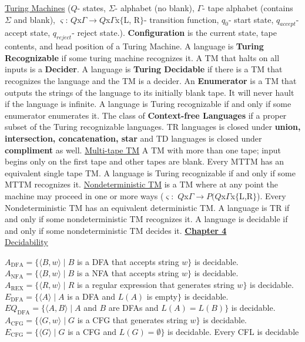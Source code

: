 \documentclass[9pt]{article}
\begin{document}
\uline{Turing Machines} ($Q$- states, $\Sigma$- alphabet (no blank), $\Gamma$- tape alphabet (contains $\Sigma$ and blank), $\varsigma$: $Q$x$\Gamma \rightarrow Q$x$\Gamma$x$\{$L, R$\}$- transition function, $q_0$- start state, $q_{accept}$- accept state, $q_{reject}$- reject state.). \textbf{Configuration} is the current state, tape contents, and head position of a Turing Machine. A language is \textbf{Turing Recognizable} if some turing machine recognizes it. A TM that halts on all inputs is a \textbf{Decider}. A language is \textbf{Turing Decidable} if there is a TM that recognizes the language and the TM is a decider. An \textbf{Enumerator} is a TM that outputs the strings of the language to its initially blank tape. It will never hault if the language is infinite. A language is Turing recognizable if and only if some enumerator enumerates it. The class of \textbf{Context-free Languages} if a proper subset of the Turing recognizable languages. TR languages is closed under \textbf{union, intersection, concatenation, star} and TD languages is closed under \textbf{compliment} as well.\newline
\uline{Multi-tape TM} A TM with more than one tape; input begins only on the first tape and other tapes are blank. Every MTTM has an equivalent single tape TM. A language is Turing recognizable if and only if some MTTM recognizes it.\newline
\uline{Nondeterministic TM} is a TM where at any point the machine may proceed in one or more ways ($\varsigma:$ $Q$x$\Gamma\rightarrow P(Q$x$\Gamma$x$\{$L,R$\}$). Every Nondeterministic TM has an equivalent deterministic TM. A language is TR if and only if some nondeterministic TM recognizes it. A language is decidable if and only if some nondeterministic TM decides it.\newline
\uline{\textbf{Chapter 4}}\\
\uline{Decidability}\newline
\begin{minipage}[t]{.48\textwidth}
    \noindent$A_{\text{DFA}}=\{\langle B,w\rangle \mid B$ is a DFA that accepts string $w\}$ is decidable.\newline
    $A_{\text{NFA}}=\{\langle B,w\rangle\mid B$ is a NFA that accepts string $w\}$ is decidable.\newline
    $A_{\text{REX}}=\{\langle R, w\rangle \mid R$ is a regular expression that generates string $w\}$ is decidable.\newline
    $E_{\text{DFA}}=\{\langle A\rangle \mid A$ is a DFA and $L(A)$ is empty$\}$ is decidable.\newline
    $EQ_{\text{DFA}}=\{\langle A,B\rangle\mid A$ and $B$ are DFAs and $L(A)=L(B)\}$ is decidable.\newline
    $A_{\text{CFG}}=\{\langle G,w\rangle\mid G$ is a CFG that generates string $w\}$ is decidable.\newline
    $E_{\text{CFG}}=\{\langle G\rangle \mid G $ is a CFG and $L(G)=\emptyset\}$ is decidable.\newline
    Every CFL is decidable
\end{minipage}\hspace{.8cm}
\end{document}
